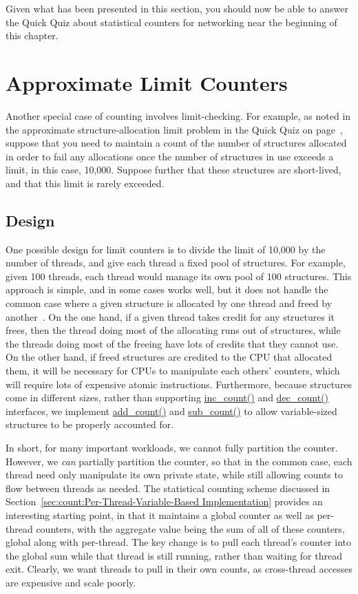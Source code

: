 Given what has been presented in this section, you should now be able
to answer the Quick Quiz about statistical counters for networking
near the beginning of this chapter.

\section{Approximate Limit Counters}
\label{sec:count:Approximate Limit Counters}

Another special case of counting involves limit-checking.
For example, as noted in the approximate structure-allocation limit
problem in the Quick Quiz on
page~\pageref{chp:Counting},
suppose that you need to maintain a count of the number of
structures allocated in order to fail any allocations once the number
of structures in use exceeds a limit, in this case, 10,000.
Suppose further that these structures are short-lived, and that this
limit is rarely exceeded.

\subsection{Design}

One possible design for limit counters is to divide the limit of 10,000
by the number of threads, and give each thread a fixed pool of structures.
For example, given 100 threads, each thread would manage its own pool
of 100 structures.
This approach is simple, and in some cases works well, but it does not
handle the common case where a given structure is allocated by one
thread and freed by another~\cite{McKenney93}.
On the one hand, if a given thread takes credit for any structures it
frees, then the thread doing most of the allocating runs out
of structures, while the threads doing most of the freeing have lots
of credits that they cannot use.
On the other hand, if freed structures are credited to the CPU that
allocated them, it will be necessary for CPUs to manipulate each
others' counters, which will require lots of expensive atomic instructions.
Furthermore, because structures come in different sizes, rather than supporting
\url{inc_count()} and \url{dec_count()} interfaces, we implement
\url{add_count()} and \url{sub_count()} to allow variable-sized structures
to be properly accounted for.

In short, for many important workloads, we cannot fully partition the counter.
However, we \emph{can} partially partition the counter,
so that in the common case, each thread need only manipulate its own
private state,
while still allowing counts to flow between threads as needed.
The statistical counting scheme discussed in
Section~\ref{sec:count:Per-Thread-Variable-Based Implementation}
provides an interesting starting point,
in that it maintains a global counter as well as per-thread counters,
with the aggregate value being the sum of all of these counters,
global along with per-thread.
The key change is to pull each thread's counter into
the global sum while that thread is still running, rather than waiting
for thread exit.
Clearly, we want threads to pull in their own counts, as cross-thread
accesses are expensive and scale poorly.

